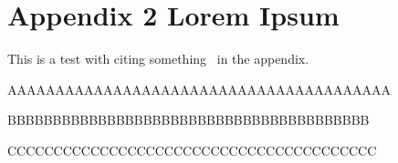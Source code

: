 
%


\chapter{Appendix 2 Lorem Ipsum}
\label{app:lorem_ipsum2}

This is a test with citing something~\cite{ecoop12-dias} in the appendix.


AAAAAAAAAAAAAAAAAAAAAAAAAAAAAAAAAAAAAAAA

\lipsum[1-9]
\restorestocksize

BBBBBBBBBBBBBBBBBBBBBBBBBBBBBBBBBBBBBBBB
\

CCCCCCCCCCCCCCCCCCCCCCCCCCCCCCCCCCCCCCCC

\lipsum[1-10]
